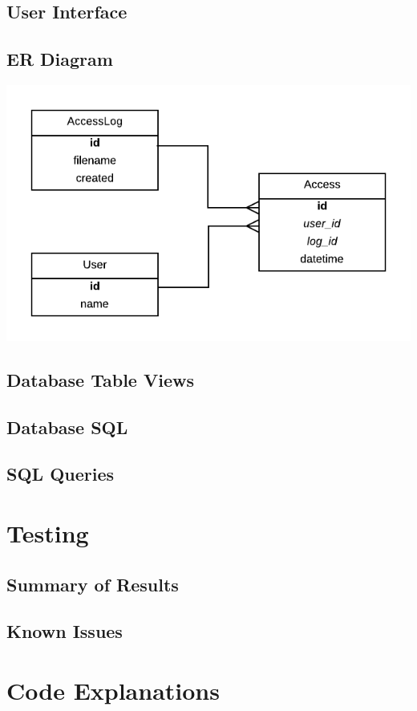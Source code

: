 \documentclass[a4paper]{article}
\begin{document}
\subsection{User Interface}
\subsection{ER Diagram}
\begin{center}
\includegraphics[scale=0.6]{../shared_assets/diagrams/ERD.png}
\end{center}
\subsection{Database Table Views}
\subsection{Database SQL}
\subsection{SQL Queries}
\section{Testing}
\subsection{Summary of Results}
\subsection{Known Issues}
\section{Code Explanations}
\end{document}
